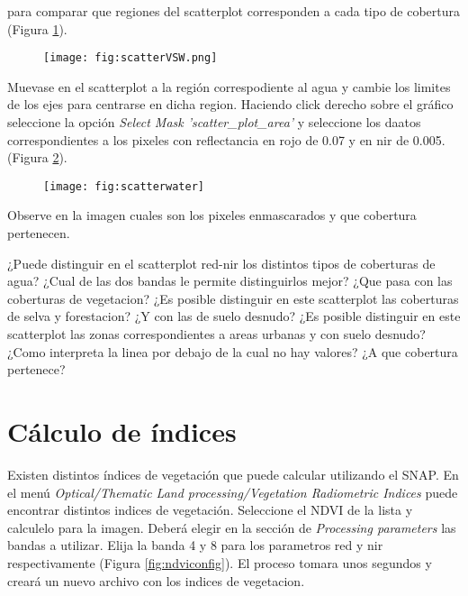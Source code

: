 para comparar que regiones del scatterplot corresponden a cada tipo de cobertura (Figura \ref{fig:scatterVSW}).

\begin{figure}[h!]
    \centering
    \texttt{[image: fig:scatterVSW.png]}
    \caption{}
    \label{fig:scatterVSW}
\end{figure}

Muevase en el scatterplot a la región correspodiente al agua y cambie los limites de los ejes para centrarse en dicha region. Haciendo click derecho sobre el gráfico seleccione la opción \emph{Select Mask 'scatter\_plot\_area'} y seleccione los daatos correspondientes a los pixeles con reflectancia en rojo de 0.07 y en nir de 0.005. (Figura \ref{fig:scatterwater}).

\begin{figure}[h!]
    \centering
    \texttt{[image: fig:scatterwater]}
    \caption{}
    \label{fig:scatterwater}
\end{figure}

Observe en la imagen cuales son los pixeles enmascarados y  que cobertura pertenecen.

\begin{que}
    ¿Puede distinguir en el scatterplot red-nir los distintos tipos de coberturas de agua? ¿Cual de las dos bandas le permite distinguirlos mejor? ¿Que pasa con las coberturas de vegetacion? ¿Es posible distinguir en este scatterplot las coberturas de selva y forestacion?  ¿Y con las de suelo desnudo? ¿Es posible distinguir en este scatterplot las zonas correspondientes a areas urbanas y con suelo desnudo? ¿Como interpreta la linea por debajo de la cual no hay valores? ¿A que cobertura pertenece?
\end{que}

\section{Cálculo de índices}

Existen distintos índices de vegetación que puede calcular utilizando el SNAP. En el menú \emph{Optical/Thematic Land processing/Vegetation Radiometric Indices} puede encontrar distintos indices de vegetación. Seleccione el NDVI de la lista y calculelo para la imagen. Deberá elegir en la sección de \emph{Processing parameters} las bandas a utilizar. Elija la banda 4 y 8 para los parametros red y nir respectivamente (Figura \ref{fig:ndviconfig}). El proceso tomara unos segundos y creará un nuevo archivo con los indices de vegetacion.

